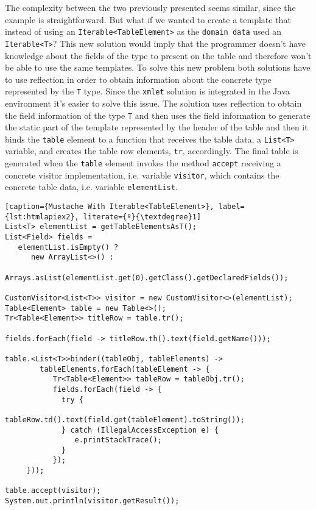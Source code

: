 \noindent
The complexity between the two previously presented seems similar, since the example is straightforward. But what if we wanted to create a template that instead of using an \texttt{Iterable<TableElement>} as the \texttt{domain data} used an \texttt{Iterable<T>}? This new solution would imply that the programmer doesn't have knowledge about the fields of the type to present on the table and therefore won't be able to use the same templates. To solve this new problem both solutions have to use reflection in order to obtain information about the concrete type represented by the \texttt{T} type. Since the \texttt{xmlet} solution is integrated in the Java environment it's easier to solve this issue. The solution uses reflection to obtain the field information of the type \texttt{T} and then uses the field information to generate the static part of the template represented by the header of the table and then it binds the \texttt{table} element to a function that receives the table data, a \texttt{List<T>} variable,  and creates  the table row elements, \texttt{tr}, accordingly. The final table is generated when the \texttt{table} element invokes the method \texttt{accept} receiving a concrete visitor implementation, i.e. variable \texttt{visitor}, which contains the concrete table data, i.e. variable \texttt{elementList}.


\begin{minipage}{\linewidth}
\begin{lstlisting}[caption={Mustache With Iterable<TableElement>}, label={lst:htmlapiex2}, literate={º}{\textdegree}1]
List<T> elementList = getTableElementsAsT();
List<Field> fields = 
   elementList.isEmpty() ? 
      new ArrayList<>() : 
      Arrays.asList(elementList.get(0).getClass().getDeclaredFields());

CustomVisitor<List<T>> visitor = new CustomVisitor<>(elementList);
Table<Element> table = new Table<>();
Tr<Table<Element>> titleRow = table.tr();

fields.forEach(field -> titleRow.th().text(field.getName()));

table.<List<T>>binder((tableObj, tableElements) ->
        tableElements.forEach(tableElement -> {
           Tr<Table<Element>> tableRow = tableObj.tr();
           fields.forEach(field -> {
             try {
                tableRow.td().text(field.get(tableElement).toString());
             } catch (IllegalAccessException e) {
                e.printStackTrace();
             }
           });
     }));

table.accept(visitor);
System.out.println(visitor.getResult());
\end{lstlisting}
\end{minipage} 

